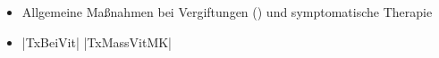 \label{m:intoxikation-uppers}
\begin{itemize}
    \item Allgemeine Maßnahmen bei Vergiftungen
    () und
    symptomatische Therapie
    \item |TxBeiVit| |TxMassVitMK|
\end{itemize}